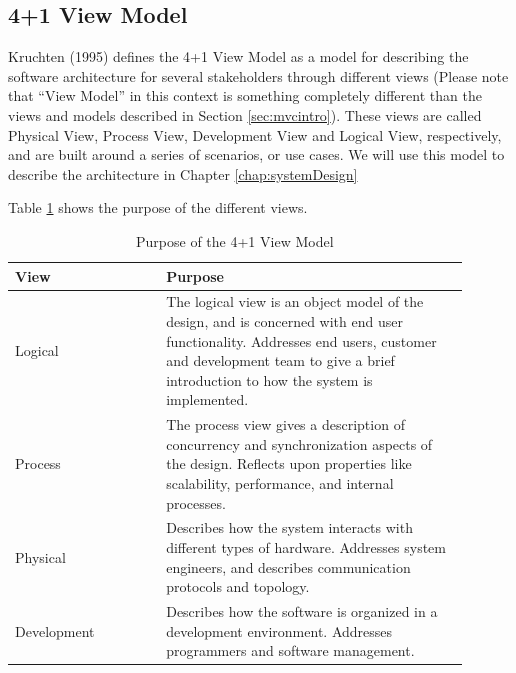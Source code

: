 \subsection{4+1 View Model}
\label{sec:viewmodel}
Kruchten (1995)\cite{4+1viewmodel} defines the 4+1 View Model as a model for describing the software architecture for
several stakeholders through different views (Please note that ``View Model'' in this context is something completely different than the views and models described in Section 
\ref{sec:mvcintro}). These views are called Physical
View, Process View, Development View and Logical View, respectively, and are built around a series of scenarios, or use cases. 
We will use this model to describe the architecture in Chapter \ref{chap:systemDesign}

Table \ref{tab:4plus1ViewModel} shows the purpose of the different views.

\begin{table}
	\centering
	\begin{tabular}{|p{0.3\linewidth} |p{0.6\linewidth}|}
		\hline View & Purpose \\
		\hline Logical & The logical view is an object model of the design, and is concerned with end user functionality. 
		Addresses end users, customer and development team to give a brief introduction to how the system is implemented.\\
		\hline Process & The process view gives a description of concurrency and synchronization aspects of the design. Reflects upon properties like scalability, performance, and internal processes. \\ 
		\hline Physical & Describes how the system interacts with different types of hardware. Addresses system engineers, and describes communication protocols and topology. \\
		\hline Development & Describes how the software is organized in a development environment. Addresses programmers and software management. \\
		\hline 
	\end{tabular}
	\label{tab:4plus1ViewModel}
	\caption{Purpose of the 4+1 View Model}
\end{table}


  
